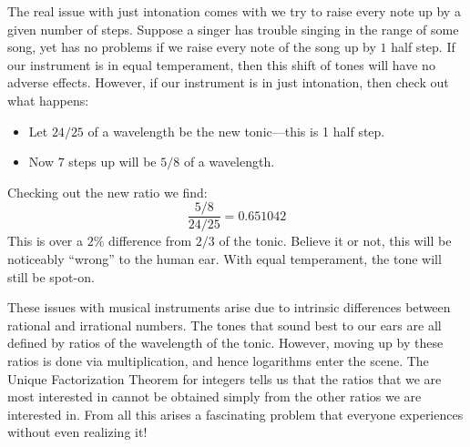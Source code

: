 The real issue with just intonation comes with we try to raise every
note up by a given number of steps. Suppose a singer has trouble
singing in the range of some song, yet has no problems if we raise
every note of the song up by $1$ half step. If our instrument is in
equal temperament, then this shift of tones will have no adverse
effects. However, if our instrument is in just intonation, then check
out what happens:
\begin{itemize}
\item Let $24/25$ of a wavelength be the new tonic---this is 1 half
  step.
\item Now $7$ steps up will be $5/8$ of a wavelength.
\end{itemize}
Checking out the new ratio we find:
\[
\frac{5/8}{24/25} = 0.651042 
\]  
This is over a $2 \%$ difference from $2/3$ of the tonic. Believe it
or not, this will be noticeably ``wrong'' to the human ear. With
equal temperament, the tone will still be spot-on.

These issues with musical instruments arise due to intrinsic
differences between rational and irrational numbers. The tones that
sound best to our ears are all defined by ratios of the wavelength of
the tonic. However, moving up by these ratios is done via
multiplication, and hence logarithms enter the scene. The Unique
Factorization Theorem for integers
tells us that the ratios that we are most interested in cannot be
obtained simply from the other ratios we are interested in. From all
this arises a fascinating problem that everyone experiences without
even realizing it!


\newpage

